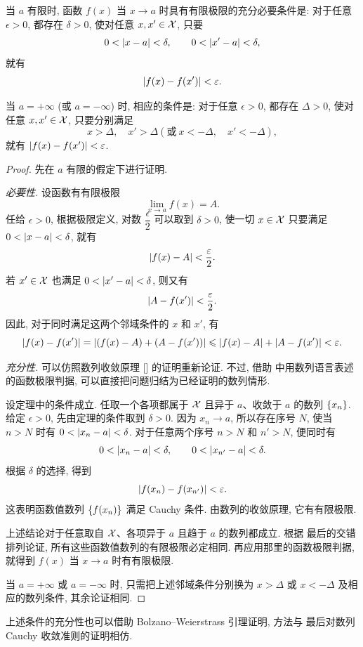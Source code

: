 \begin{theorem}\label{thm:function_cauchy_criterion}
当 $a$ 有限时, 函数 $f(x)$ 当 $x\to a$ 时具有有限极限的充分必要条件是:
对于任意 $\epsilon>0$, 都存在 $\delta>0$, 使对任意 $x,x'\in\mathcal{X}$, 只要
$$
0<\left| x-a \right|<\delta,\qquad 0<\left| x'-a \right|<\delta,
$$
就有
$$
\left| f(x)-f(x') \right|<\varepsilon.
$$

当 $a=+\infty$ (或 $a=-\infty$) 时, 相应的条件是:
对于任意 $\epsilon>0$, 都存在 $\Delta>0$, 使对任意 $x,x'\in\mathcal{X}$,
只要分别满足
$$
x>\Delta,\quad x'>\Delta (\text{或}\ x<-\Delta,\quad x'<-\Delta),
$$
就有 $\left| f(x)-f(x') \right|<\varepsilon$.
\end{theorem}

\begin{proof}
先在 $a$ 有限的假定下进行证明.

\emph{必要性.}
设函数有有限极限
$$
\lim_{x\to a}f(x)=A.
$$
任给 $\epsilon>0$, 根据极限定义, 对数 $\dfrac{\epsilon}{2}$ 可以取到 $\delta>0$,
使一切 $x\in\mathcal{X}$ 只要满足 $0<\left| x-a \right|<\delta$, 就有
$$
\left| f(x)-A \right|<\frac{\varepsilon}{2}.
$$
若 $x'\in\mathcal{X}$ 也满足 $0<\left| x'-a \right|<\delta$, 则又有
$$
\left| A-f(x') \right|<\frac{\varepsilon}{2}.
$$
因此, 对于同时满足这两个邻域条件的 $x$ 和 $x'$, 有
$$
\left| f(x)-f(x') \right|
=\left| \left( f(x)-A \right)+\left( A-f(x') \right) \right|
\leqslant\left| f(x)-A \right|+\left| A-f(x') \right|<\varepsilon.
$$

\emph{充分性.}
可以仿照数列收敛原理 [] 的证明重新论证.
不过, 借助  中用数列语言表述的函数极限判据,
可以直接把问题归结为已经证明的数列情形.

设定理中的条件成立.
任取一个各项都属于 $\mathcal{X}$ 且异于 $a$、收敛于 $a$ 的数列 $\{x_{n}\}$.
给定 $\epsilon>0$, 先由定理的条件取到 $\delta>0$.
因为 $x_n\to a$, 所以存在序号 $N$, 使当 $n>N$ 时有 $0<\left| x_n-a \right|<\delta$.
对于任意两个序号 $n>N$ 和 $n'>N$, 便同时有
$$
0<\left| x_n-a \right|<\delta,\qquad 0<\left| x_{n'}-a \right|<\delta.
$$
根据 $\delta$ 的选择, 得到
$$
\left| f(x_n)-f(x_{n'}) \right|<\varepsilon.
$$
这表明函数值数列 $\left\{ f(x_n) \right\}$ 满足 Cauchy 条件.
由数列的收敛原理, 它有有限极限.

上述结论对于任意取自 $\mathcal{X}$、各项异于 $a$ 且趋于 $a$ 的数列都成立.
根据  最后的交错排列论证, 所有这些函数值数列的有限极限必定相同.
再应用那里的函数极限判据, 就得到 $f(x)$ 当 $x\to a$ 时有有限极限.

当 $a=+\infty$ 或 $a=-\infty$ 时,
只需把上述邻域条件分别换为 $x>\Delta$ 或 $x<-\Delta$ 及相应的数列条件,
其余论证相同.
\end{proof}

上述条件的充分性也可以借助 Bolzano--Weierstrass 引理证明,
方法与  最后对数列 Cauchy 收敛准则的证明相仿.


